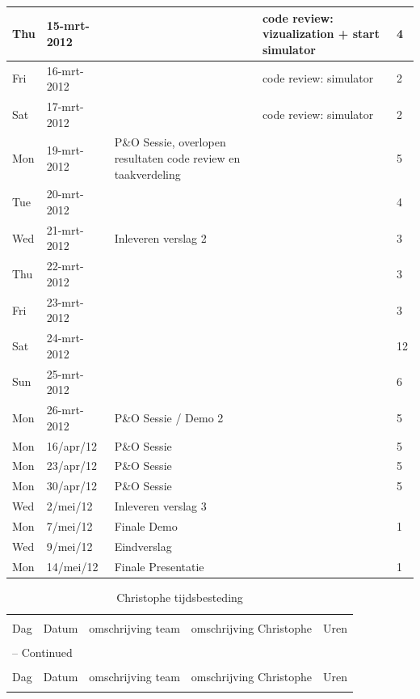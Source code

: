 \documentclass[12pt,a4paper]{report}
\begin{document}
\begin{landscape}
\begin{longtable}{llp{7cm}p{10cm}l}
\hline
Thu & 15-mrt-2012 &  & code review: vizualization + start simulator & 4 \\ 
\hline
Fri & 16-mrt-2012 &  & code review: simulator & 2 \\ 
\hline
Sat & 17-mrt-2012 &  & code review: simulator & 2 \\ 
\hline
Mon & 19-mrt-2012 & P\&O Sessie, overlopen resultaten code review en taakverdeling &  & 5 \\ 
\hline
Tue & 20-mrt-2012 &  &  & 4 \\ 
\hline
Wed & 21-mrt-2012 & Inleveren verslag 2 &  & 3 \\ 
\hline
Thu & 22-mrt-2012 &  &  & 3 \\ 
\hline
Fri & 23-mrt-2012 &  &  & 3 \\ 
\hline
Sat & 24-mrt-2012 &  &  & 12 \\ 
\hline
Sun & 25-mrt-2012 &  &  & 6 \\ 
\hline
Mon & 26-mrt-2012 & P\&O Sessie / Demo 2 &  & 5 \\ 
\hline
Mon & 16/apr/12 & P\&O Sessie &  & 5 \\ 
\hline
Mon & 23/apr/12 & P\&O Sessie &  & 5 \\ 
\hline
Mon & 30/apr/12 & P\&O Sessie &  & 5 \\ 
\hline
Wed & 2/mei/12 & Inleveren verslag 3 &  &  \\ 
\hline
Mon & 7/mei/12 & Finale Demo &  & 1 \\ 
\hline
Wed & 9/mei/12 & Eindverslag &  &  \\ 
\hline
Mon & 14/mei/12 & Finale Presentatie &  & 1 \\ 
\hline

\end{longtable}
\normalsize


\begin{longtable}{llp{7cm}p{10cm}l}
\caption{Christophe tijdsbesteding} \\

\hline \hline \\[-2ex]
  \multicolumn{1}{l}{Dag} & \multicolumn{1}{l}{Datum} &
  \multicolumn{1}{p{7cm}}{omschrijving team} &
  \multicolumn{1}{p{10cm}}{omschrijving Christophe} &
  \multicolumn{1}{l}{Uren}  \\[0.5ex] \hline \\[-1.8ex]
\endfirsthead

\multicolumn{5}{l}{{\tablename} \thetable{} -- Continued} \\[0.5ex]
\hline \hline \\[-2ex]
  \multicolumn{1}{l}{Dag} & \multicolumn{1}{l}{Datum} &
  \multicolumn{1}{p{7cm}}{omschrijving team} &
  \multicolumn{1}{p{10cm}}{omschrijving Christophe} &
  \multicolumn{1}{l}{Uren}  \\[0.5ex] \hline \\[-1.8ex]
\endhead


\end{longtable}
\end{landscape}
\end{document}
